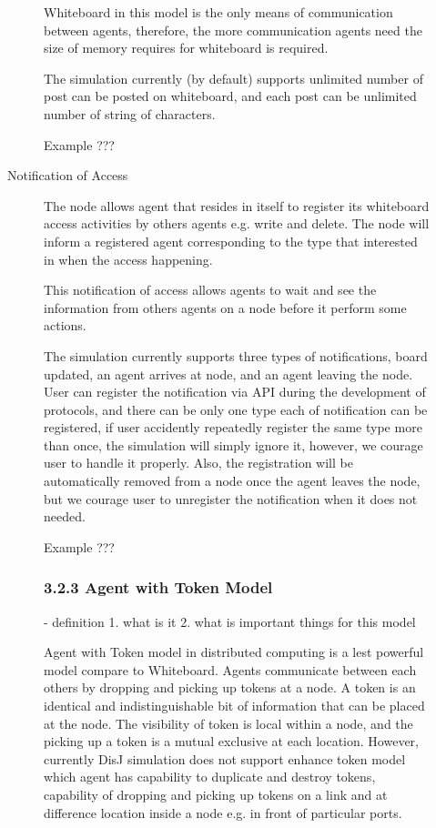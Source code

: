 \begin{description}
\begin{description}
Whiteboard in this model is the only means of communication between agents, therefore, the more communication agents need the size of memory requires for whiteboard is required.

The simulation currently (by default) supports unlimited number of post can be posted on whiteboard, and each post can be unlimited number of string of characters.

Example ???

\item[Notification of Access]
The node allows agent that resides in itself to register its whiteboard access activities by others agents e.g. write and delete. The node will inform a registered agent corresponding to the type that interested in when the access happening.

This notification of access allows agents to wait and see the information from others agents on a node before it perform some actions.

The simulation currently supports three types of notifications, board updated, an agent arrives at node, and an agent leaving the node. User can register the notification via API during the development of protocols, and there can be only one type each of notification can be registered, if user accidently repeatedly register the same type more than once, the simulation will simply ignore it, however, we courage user to handle it properly. Also, the registration will be automatically removed from a node once the agent leaves the node, but we courage user to unregister the notification when it does not needed.

Example ???


\subsubsection{3.2.3 Agent with Token Model}
- definition
1. what is it
2. what is important things for this model

Agent with Token model in distributed computing is a lest powerful model compare to Whiteboard. Agents communicate between each others by dropping and picking up tokens at a node. A token is an identical and indistinguishable bit of information that can be placed at the node. The visibility of token is local within a node, and the picking up a token is a mutual exclusive at each location. However, currently DisJ simulation does not support enhance token model which agent has capability to duplicate and destroy tokens, capability of dropping and picking up tokens on a link and at difference location inside a node e.g. in front of particular ports.


\end{description}
\end{description}
